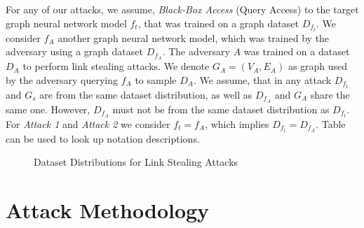     For any of our attacks, we assume, \emph{Black-Box Access} (Query Access) to the target graph neural network model $f_t$, that was trained on a graph dataset $D_{f_t}$.
    We consider $f_A$ another graph neural network model, which was trained by the adversary using a graph dataset $D_{f_A}$.
    The adversary $A$ was trained on a dataset $D_A$ to perform link stealing attacks.
    We denote $G_A = (V_A, E_A)$ as graph used by the adversary querying $f_A$ to sample $D_A$.
    We assume, that in any attack $D_{f_t}$ and $G_s$ are from the same dataset distribution, as well as $D_{f_A}$ and $G_A$ share the same one.
    However, $D_{f_A}$ must not be from the same dataset distribution as $D_{f_t}$.
    For \emph{Attack 1} and \emph{Attack 2} we consider $f_t = f_A$, which implies $D_{f_t} = D_{f_A}$. 
    Table  can be used to look up notation descriptions.

    \begin{figure}[h!]
      \caption{Dataset Distributions for Link Stealing Attacks}
      \label{figure:dataset-distribution}
    \end{figure}

    

  \section{Attack Methodology}


